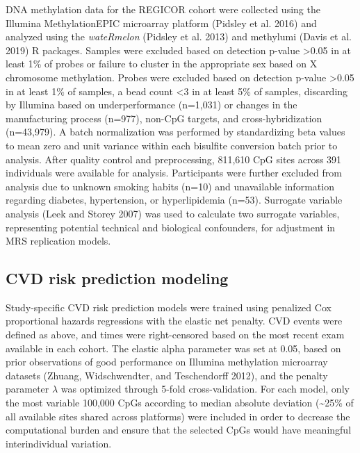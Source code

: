 \documentclass[]{article}
\begin{document}
DNA methylation data for the REGICOR cohort were collected using the
Illumina MethylationEPIC microarray platform (Pidsley et al. 2016) and
analyzed using the \emph{wateRmelon} (Pidsley et al. 2013) and methylumi
(Davis et al. 2019) R packages. Samples were excluded based on detection
p-value \textgreater{}0.05 in at least 1\% of probes or failure to
cluster in the appropriate sex based on X chromosome methylation. Probes
were excluded based on detection p-value \textgreater{}0.05 in at least
1\% of samples, a bead count \textless{}3 in at least 5\% of samples,
discarding by Illumina based on underperformance (n=1,031) or changes in
the manufacturing process (n=977), non-CpG targets, and
cross-hybridization (n=43,979). A batch normalization was performed by
standardizing beta values to mean zero and unit variance within each
bisulfite conversion batch prior to analysis. After quality control and
preprocessing, 811,610 CpG sites across 391 individuals were available
for analysis. Participants were further excluded from analysis due to
unknown smoking habits (n=10) and unavailable information regarding
diabetes, hypertension, or hyperlipidemia (n=53). Surrogate variable
analysis (Leek and Storey 2007) was used to calculate two surrogate
variables, representing potential technical and biological confounders,
for adjustment in MRS replication models.

\hypertarget{cvd-risk-prediction-modeling}{%
\subsection{CVD risk prediction
modeling}\label{cvd-risk-prediction-modeling}}

Study-specific CVD risk prediction models were trained using penalized
Cox proportional hazards regressions with the elastic net penalty. CVD
events were defined as above, and times were right-censored based on the
most recent exam available in each cohort. The elastic alpha parameter
was set at 0.05, based on prior observations of good performance on
Illumina methylation microarray datasets (Zhuang, Widschwendter, and
Teschendorff 2012), and the penalty parameter \(\lambda\) was optimized
through 5-fold cross-validation. For each model, only the most variable
100,000 CpGs according to median absolute deviation
(\textasciitilde{}25\% of all available sites shared across platforms)
were included in order to decrease the computational burden and ensure
that the selected CpGs would have meaningful interindividual variation.
\end{document}
